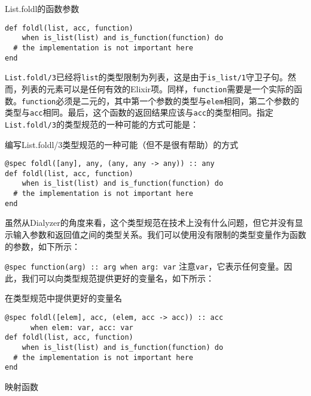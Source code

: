 \begin{code}{List.foldl的函数参数}

\begin{verbatim}
def foldl(list, acc, function)
    when is_list(list) and is_function(function) do
  # the implementation is not important here
end
\end{verbatim}
\end{code}

\texttt{List.foldl/3}已经将\texttt{list}的类型限制为列表，这是由于\texttt{is\_list/1}守卫子句。然而，列表的元素可以是任何有效的Elixir项。同样，\texttt{function}需要是一个实际的函数。\texttt{function}必须是二元的，其中第一个参数的类型与\texttt{elem}相同，第二个参数的类型与\texttt{acc}相同。最后，这个函数的返回结果应该与\texttt{acc}的类型相同。指定\texttt{List.foldl/3}的类型规范的一种可能的方式可能是：

\begin{code}{编写List.foldl/3类型规范的一种可能（但不是很有帮助）的方式}

\begin{verbatim}
@spec foldl([any], any, (any, any -> any)) :: any
def foldl(list, acc, function)
    when is_list(list) and is_function(function) do
  # the implementation is not important here
end
\end{verbatim}
\end{code}

虽然从Dialyzer的角度来看，这个类型规范在技术上没有什么问题，但它并没有显示输入参数和返回值之间的类型关系。我们可以使用没有限制的类型变量作为函数的参数，如下所示：

\texttt{@spec function(arg) :: arg when arg: var}
注意\texttt{var}，它表示任何变量。因此，我们可以向类型规范提供更好的变量名，如下所示：

\begin{code}{在类型规范中提供更好的变量名}

\begin{verbatim}
@spec foldl([elem], acc, (elem, acc -> acc)) :: acc
      when elem: var, acc: var
def foldl(list, acc, function)
    when is_list(list) and is_function(function) do
  # the implementation is not important here
end
\end{verbatim}
\end{code}

\begin{example}{映射函数}
\end{example}

